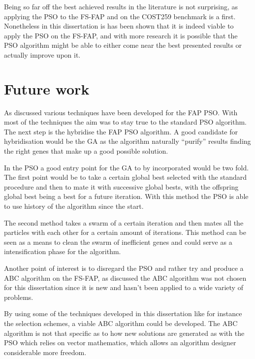 Being so far off the best achieved results in the literature is not surprising, as applying the PSO to the FS-FAP and on the COST259 benchmark is a first. Nonetheless in this dissertation is has been shown that it is indeed viable to apply the PSO on the FS-FAP, and with more research it is possible that the PSO algorithm might be able to either come near the best presented results or actually improve upon it.

\section{Future work}
As discussed various techniques have been developed for the FAP PSO. With most of the techniques the aim was to stay true to the standard PSO algorithm. The next step is the hybridise the FAP PSO algorithm. A good candidate for hybridisation would be the GA as the algorithm naturally ``purify'' results finding the right genes that make up a good possible solution.

In the PSO a good entry point for the GA to by incorporated would be two fold. The first point would be to take a certain global best selected with the standard procedure and then to mate it with successive global bests, with the offspring global best being a best for a future iteration. With this method the PSO is able to use history of the algorithm since the start.

The second method takes a swarm of a certain iteration and then mates all the particles with each other for a certain amount of iterations. This method can be seen as a means to clean the swarm of inefficient genes and could serve as a intensification phase for the algorithm.

Another point of interest is to disregard the PSO and rather try and produce a ABC algorithm on the FS-FAP, as discussed the ABC algorithm was not chosen for this dissertation since it is new and hasn't been applied to a wide variety of problems. 

By using some of the techniques developed in this dissertation like for instance the selection schemes, a viable ABC algorithm could be developed. The ABC algorithm is not that specific as to how new solutions are generated as with the PSO which relies on vector mathematics, which allows an algorithm designer considerable more freedom.





